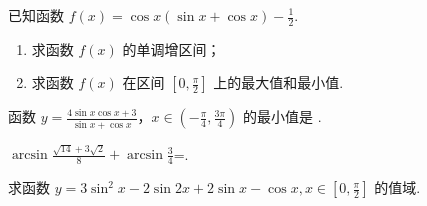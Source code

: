 \documentclass[a4paper , final]{ctexart}
\newenvironment{problem}[1]{%
  \item #1
  \par
  \vspace{8cm}
}{}
\begin{document}
\begin{problems}
  \begin{problem}
  {
  已知函数 $f(x) = \cos x(\sin x + \cos x) - \frac{1}{2}$.
  \begin{enumerate}[label=(\arabic*)]
    \item 求函数 $f(x)$ 的单调增区间；
    \item 求函数 $f(x)$ 在区间 $\left[0, \frac{\pi}{2}\right]$ 上的最大值和最小值.
  \end{enumerate}
  }
  \end{problem}

  \begin{problem}
  {
  函数 $y = \frac{4\sin x\cos x + 3}{\sin x + \cos x}$，$x \in \left(-\frac{\pi}{4}, \frac{3\pi}{4}\right)$ 的最小值是 \underline{\hspace{3cm}}.
  }
  \end{problem}

  \begin{problem}
  {
  $\arcsin \frac{\sqrt{14}+3\sqrt{2}}{8}+\arcsin\frac{3}{4}$=\underline{\hspace{3cm}}.
  }
  \end{problem}

  \begin{problem}
  {
  求函数 $y = 3\sin^2 x - 2\sin 2x + 2\sin x - \cos x, x \in \left[0, \frac{\pi}{2}\right]$ 的值域.
  }
  \end{problem}
\end{problems}

\newpage
\end{document}
